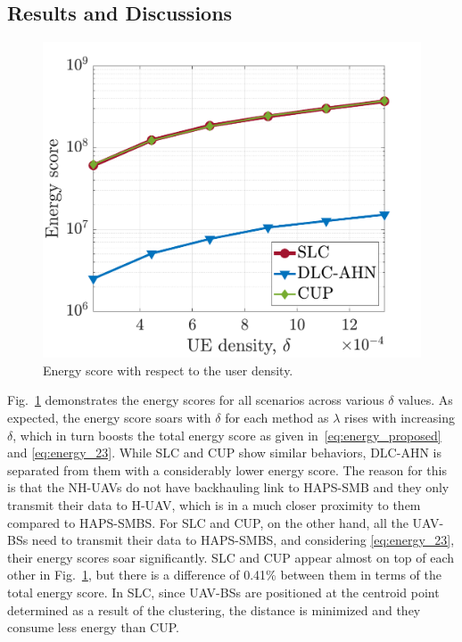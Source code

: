 \documentclass[conference, a4paper]{IEEEtran}
\begin{document}
\subsection{Results and Discussions}
\begin{figure}[b!]
    \centering
     \shorthandoff{=}
    \includegraphics[width=.75\linewidth]{Figures/Energy-eps-converted-to.pdf}
    \shorthandoff{=}
    \caption{Energy score with respect to the user density.}
    \label{fig:energy}
\end{figure}
Fig.~\ref{fig:energy} demonstrates the energy scores for all scenarios across various $\delta$ values.
As expected, the energy score soars with $\delta$ for each method as $\lambda$ rises with increasing $\delta$, which in turn boosts the total energy score as given in~\eqref{eq:energy_proposed} and \eqref{eq:energy_23}.
While SLC and CUP show similar behaviors, DLC-AHN is separated from them with a considerably lower energy score. 
The reason for this is that the NH-UAVs do not have backhauling link to HAPS-SMB and they only transmit their data to H-UAV, which is in a much closer proximity to them compared to HAPS-SMBS.
For SLC and CUP, on the other hand, all the UAV-BSs need to transmit their data to HAPS-SMBS, and considering \eqref{eq:energy_23}, their energy scores soar significantly.
SLC and CUP appear almost on top of each other in Fig.~\ref{fig:energy}, but there is a difference of 0.41\% between them in terms of the total energy score.
In SLC, since UAV-BSs are positioned at the centroid point determined as a result of the clustering, the distance is minimized and they consume less energy than CUP.
\end{document}
